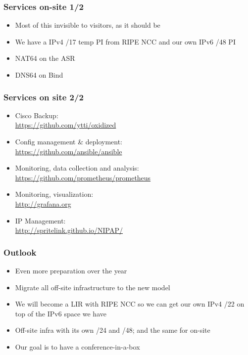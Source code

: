 \documentclass[t]{beamer}
\begin{document}
\begin{frame}
	\frametitle{Services on-site 1/2}
	\vfill
	\begin{itemize}
		\item Most of this invisible to visitors, as it should be
		\item We have a IPv4 /17 temp PI from RIPE NCC and our own IPv6 /48 PI
		\item NAT64 on the ASR
		\item DNS64 on Bind
	\end{itemize}
	\vfill
\end{frame}

\begin{frame}
	\frametitle{Services on site 2/2}
	\vfill
	\begin{itemize}
		\item Cisco Backup: \\ \url{https://github.com/ytti/oxidized}
		\item Config management \& deployment: \\ \url{https://github.com/ansible/ansible}
		\item Monitoring, data collection and analysis: \\ \url{https://github.com/prometheus/prometheus}
		\item Monitoring, visualization: \\ \url{http://grafana.org}
		\item IP Management: \\ \url{http://spritelink.github.io/NIPAP/}
	\end{itemize}
	\vfill
\end{frame}

\begin{frame}
	\frametitle{Outlook}
	\vfill
	\begin{itemize}
		\item Even more preparation over the year
		\item Migrate all off-site infrastructure to the new model
		\item We will become a LIR with RIPE NCC so we can get our own IPv4 /22 on top of the IPv6 space we have
		\item Off-site infra with its own /24 and /48; and the same for on-site
		\item Our goal is to have a conference-in-a-box
	\end{itemize}
	\vfill
\end{frame}
\end{document}
